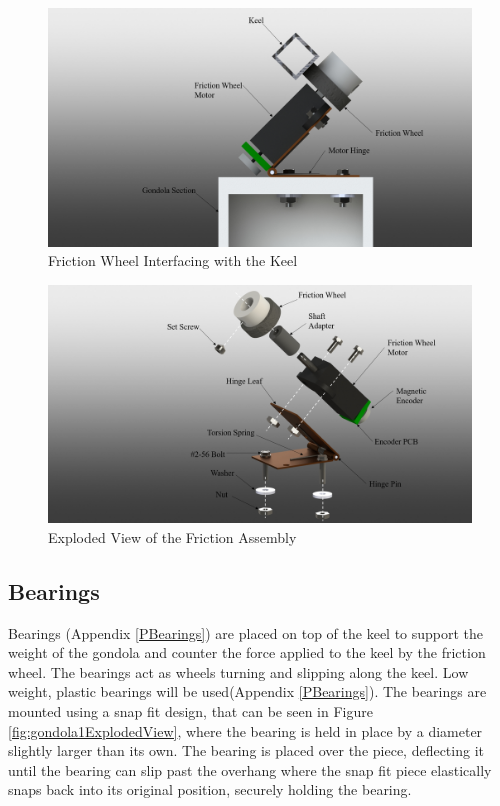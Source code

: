 \documentclass[../main.tex]{subfiles}
\begin{document}
\begin{figure}[H]
	\centering
	\includegraphics[width=.8\linewidth]{img/design/gondola/frictionWheelOnGondola.png}
	\caption{Friction Wheel Interfacing with the Keel}
		\label{fig:frictionWheelOnGondola}
\end{figure}
\begin{figure}[H]
	\centering
	\includegraphics[width=.8\linewidth]{img/design/gondola/explodedFrictionWheel.png}
	\caption{Exploded View of the Friction Assembly}
	\label{fig:explodedFrictionWheel}
\end{figure}

\subsection{Bearings}
Bearings (Appendix \ref{PBearings}) are placed on top of the keel to support the weight of the gondola and counter the force applied to the keel by the friction wheel. The bearings act as wheels turning and slipping along the keel. Low weight, plastic bearings will be used(Appendix \ref{PBearings}). The bearings are mounted using a snap fit design, that can be seen in Figure \ref{fig:gondola1ExplodedView}, where the bearing is held in place by a diameter slightly larger than its own. The bearing is placed over the piece, deflecting it until the bearing can slip past the overhang where the snap fit piece elastically snaps back into its original position, securely holding the bearing.
\\
\end{document}
